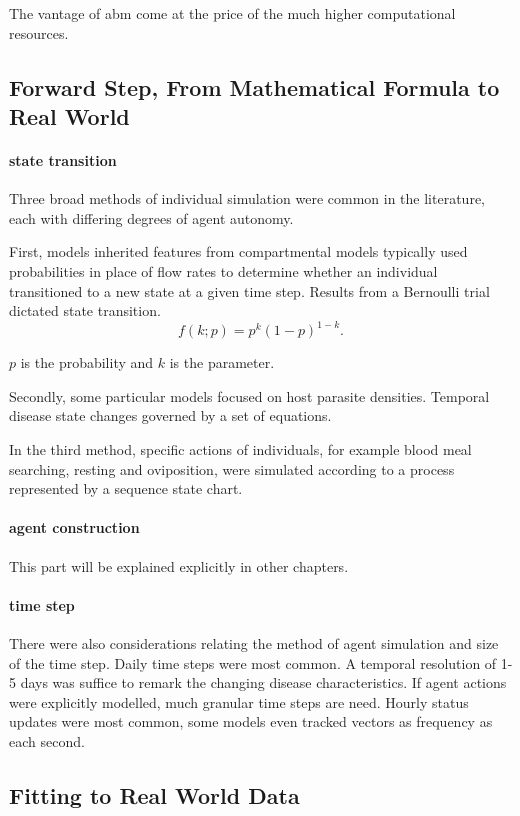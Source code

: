 \documentclass[a4paper, 12pt, twoside]{article}
\begin{document}
The vantage of \gls{abm} come at the price of the much higher computational resources.

\subsection{Forward Step, From Mathematical Formula to Real World}

\paragraph{state transition}%
\label{par:state_transition}
Three broad methods of individual simulation were common in the literature, each with differing degrees of agent autonomy.

First, models inherited features from compartmental models typically used probabilities in place of flow rates to determine whether an individual transitioned to a new state at a given time step.
Results from a Bernoulli trial dictated state transition.
\[
	f(k;p) = p^k ( 1 - p )^{1 - k}
	.\]

$p$ is the probability and  $k$ is the parameter.

Secondly, some particular models focused on host parasite densities.
Temporal disease state changes governed by a set of equations.

In the third method, specific actions of individuals, for example blood meal searching, resting and oviposition, were simulated according to a process represented by a sequence state chart.

\paragraph{agent construction}%
\label{par:agent_construction}
This part will be explained explicitly in other chapters.

\paragraph{time step}%
\label{par:time_step}
There were also considerations relating the method of agent simulation and size of the time step.
Daily time steps were most common.
A temporal resolution of 1-5 days was suffice to remark the changing disease characteristics.
If agent actions were explicitly modelled, much granular time steps are need.
Hourly status updates were most common, some models even tracked vectors as frequency as each second.

\subsection{Fitting to Real World Data}
\end{document}
